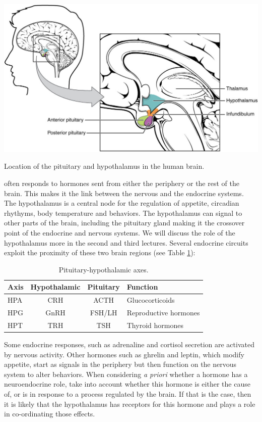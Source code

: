 \documentclass{tufte-handout}
\begin{document}
\begin{marginfigure}
  \includegraphics{figures/pituitary-hypothalamus}
  \caption{Location of the pituitary and hypothalamus in the human brain.}
    \label{fig:pituitary-hypothalamus}
\end{marginfigure}

 often responds to hormones sent from either the periphery or the rest of the brain.  This makes it the link between the nervous and the endocrine systems.  The hypothalamus is a central node for the regulation of appetite, circadian rhythyms, body temperature and behaviors.  The hypothalamus can signal to other parts of the brain, including the pituitary gland making it the crossover point of the endocrine and nervous systems.  We will discuss the role of the hypothalamus more in the second and third lectures.  Several endocrine circuits exploit the proximity of these two brain regions (see Table \ref{tab:pituitary-axes}):

\begin{table}
  \centering
  \begin{tabular}{lccl}
    \toprule
    Axis & Hypothalamic & Pituitary & Function \\
    \midrule
    HPA & CRH & ACTH & Glucocorticoids \\
    HPG & GnRH & FSH/LH & Reproductive hormones \\
    HPT & TRH & TSH & Thyroid hormones \\
    \bottomrule
  \end{tabular}
  \caption{Pituitary-hypothalamic axes.}
  \label{tab:pituitary-axes}
\end{table}

  Some endocrine responses, such as adrenaline and cortisol secretion are activated by nervous activity.  Other hormones such as ghrelin and leptin, which modify appetite, start as signals in the periphery but then function on the nervous system to alter behaviors.  When considering \textit{a priori} whether a hormone has a neuroendocrine role, take into account whether this hormone is either the cause of, or is in response to a process regulated by the brain.  If that is the case, then it is likely that the hypothalamus has receptors for this hormone and plays a role in co-ordinating those effects.

\listoffigures
\listoftables



\end{document}
